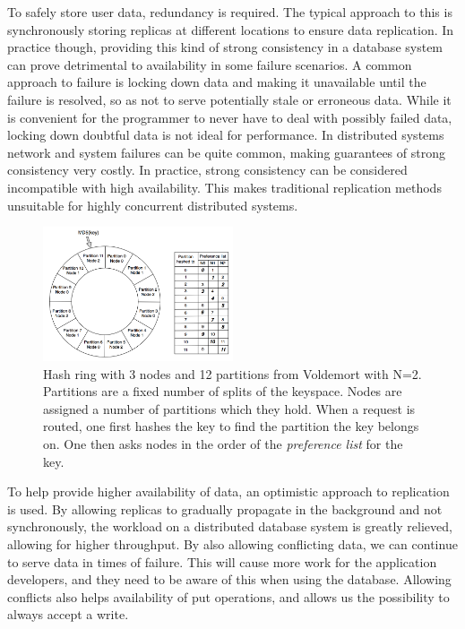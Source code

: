 To safely store user data, redundancy is required. 
The typical approach to this is synchronously storing replicas at different locations to ensure data replication. 
In practice though, providing this kind of strong consistency in a database system can prove detrimental to availability in some failure scenarios.
A common approach to failure is locking down data and making it unavailable until the failure is resolved, so as not to serve potentially stale or erroneous data.
While it is convenient for the programmer to never have to deal with possibly failed data, locking down doubtful data is not ideal for performance.
In distributed systems network and system failures can be quite common, making guarantees of strong consistency very costly. In practice, strong consistency can be considered incompatible with high availability.
This makes traditional replication methods unsuitable for highly concurrent distributed systems.

\begin{figure}
    \includegraphics[width=0.5\textwidth]{introduction/hashring_voldemort}
    \caption{Hash ring with 3 nodes and 12 partitions from Voldemort\cite{dynamo} with N=2. Partitions are a fixed number of splits of the keyspace. Nodes are assigned a number of partitions which they hold. When a request is routed, one first hashes the key to find the partition the key belongs on. One then asks nodes in the order of the \emph{preference list} for the key.}
    \label{fig:voldemort_hashring}
\end{figure}

To help provide higher availability of data, an optimistic approach to replication is used.
By allowing replicas to gradually propagate in the background and not synchronously, the workload on a distributed database system is greatly relieved, allowing for higher throughput. By also allowing conflicting data, we can continue to serve data in times of failure. This will cause more work for the application developers, and they need to be aware of this when using the database. Allowing conflicts also helps availability of put operations, and allows us the possibility to always accept a write.

